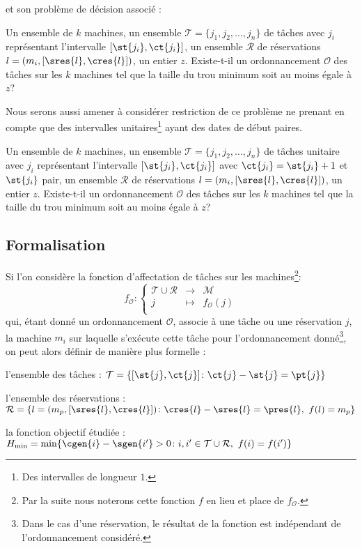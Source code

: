 \documentclass[a4paper,9pt]{report}
\begin{document}
et son problème de décision associé :

\dfdec{\fischedpi}
{Un ensemble de $k$ machines, un ensemble $\mathcal{T} = \{j_1, j_2, \dots, j_n\}$ de tâches avec
    $j_i$ représentant l'intervalle $[\st{j_i}, \ct{j_i}]$, un ensemble $\mathcal{R}$ de
réservations $l = (m_i, [\sres{l}, \cres{l}])$, un entier $z$.}
{Existe-t-il un ordonnancement $\mathcal{O}$ des tâches sur les $k$ machines tel que la taille du
trou minimum soit au moins égale à $z$?}

Nous serons aussi amener à considérer restriction de ce problème ne prenant en compte que des
intervalles unitaires\footnote{Des intervalles de longueur $1$.} ayant des dates de début paires.

\dfdec[unitfischedpi]{\unitfischedpi}
{Un ensemble de $k$ machines, un ensemble $\mathcal{T} = \{j_1, j_2, \dots, j_n\}$ de tâches
unitaire avec $j_i$ représentant l'intervalle $[\st{j_i}, \ct{j_i}]$ avec $\ct{j_i} = \st{j_i} +
1$ et $\st{j_i}$ pair, un ensemble $\mathcal{R}$ de réservations $l = (m_i, [\sres{l}, \cres{l}])$,
un entier $z$.}
{Existe-t-il un ordonnancement $\mathcal{O}$ des tâches sur les $k$ machines tel que la taille du
trou minimum soit au moins égale à $z$?}


\subsection{Formalisation}
    Si l'on considère la fonction d'affectation de tâches sur les machines\footnote{Par la suite
    nous noterons cette fonction $f$ en lieu et place de $f_{\mathcal{O}}$.}: \[
        f_{\mathcal{O}} : \left \lbrace \begin{array}{rcl}
            \mathcal{T} \cup \mathcal{R} & \longrightarrow & \mathcal{M} \\
            j & \mapsto & f_{\mathcal{O}}(j) \\
        \end{array}
        \right .
    \]
    qui, étant donné un ordonnancement $\mathcal{O}$, associe à une tâche ou une réservation $j$, la
    machine $m_i$ sur laquelle s'exécute cette tâche pour l'ordonnancement donné\footnote{Dans le
    cas d'une réservation, le résultat de la fonction est indépendant de l'ordonnancement
    considéré.}, on peut alors définir de manière plus formelle : \begin{bitemize}
        \item l'ensemble des tâches : \hfill $ \mathcal{T} = \{[\st{j}, \ct{j}]   \colon  
            \ct{j} - \st{j} = \pt{j} \} $
        \item l'ensemble des réservations : \hfill $\mathcal{R} = \{l = (m_p, [\sres{l}, \cres{l}])  
            \colon   \cres{l} - \sres{l} = \pres{l},\ f(l) = m_p\}$
        \item la fonction objectif étudiée : \hfill $H_{\min} = \min \{ \cgen{i} - \sgen{i'} > 0  
            \colon   i,i' \in \mathcal{T} \cup \mathcal{R},\ f(i) = f(i')\}$
    \end{bitemize}
\end{document}
